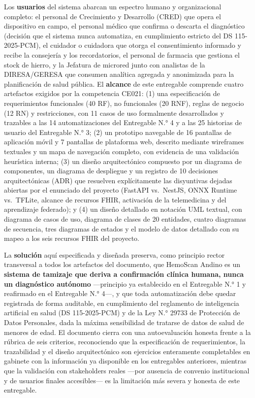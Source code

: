 \documentclass[11pt,a4paper]{article}
\begin{document}
Los \textbf{usuarios} del sistema abarcan un espectro humano y organizacional completo: el personal de Crecimiento y Desarrollo (CRED) que opera el dispositivo en campo, el personal médico que confirma o descarta el diagnóstico (decisión que el sistema nunca automatiza, en cumplimiento estricto del DS 115-2025-PCM), el cuidador o cuidadora que otorga el consentimiento informado y recibe la consejería y los recordatorios, el personal de farmacia que gestiona el stock de hierro, y la Jefatura de microred junto con analistas de la DIRESA/GERESA que consumen analítica agregada y anonimizada para la planificación de salud pública. El \textbf{alcance} de este entregable comprende cuatro artefactos exigidos por la competencia CE021: (1) una especificación de requerimientos funcionales (40 RF), no funcionales (20 RNF), reglas de negocio (12 RN) y restricciones, con 11 casos de uso formalmente desarrollados y trazables a las 14 automatizaciones del Entregable N.° 4 y a las 25 historias de usuario del Entregable N.° 3; (2) un prototipo navegable de 16 pantallas de aplicación móvil y 7 pantallas de plataforma web, descrito mediante wireframes textuales y un mapa de navegación completo, con evidencia de una validación heurística interna; (3) un diseño arquitectónico compuesto por un diagrama de componentes, un diagrama de despliegue y un registro de 10 decisiones arquitectónicas (ADR) que resuelven explícitamente las disyuntivas dejadas abiertas por el enunciado del proyecto (FastAPI vs.~NestJS, ONNX Runtime vs.~TFLite, alcance de recursos FHIR, activación de la telemedicina y del aprendizaje federado); y (4) un diseño detallado en notación UML textual, con diagrama de casos de uso, diagrama de clases de 20 entidades, cuatro diagramas de secuencia, tres diagramas de estados y el modelo de datos detallado con su mapeo a los seis recursos FHIR del proyecto.

La \textbf{solución} aquí especificada y diseñada preserva, como principio rector transversal a todos los artefactos del documento, que HemoScan Andino es un \textbf{sistema de tamizaje que deriva a confirmación clínica humana, nunca un diagnóstico autónomo} ---principio ya establecido en el Entregable N.° 1 y reafirmado en el Entregable N.° 4---, y que toda automatización debe quedar registrada de forma auditable, en cumplimiento del reglamento de inteligencia artificial en salud (DS 115-2025-PCM) y de la Ley N.° 29733 de Protección de Datos Personales, dada la máxima sensibilidad de tratarse de datos de salud de menores de edad. El documento cierra con una autoevaluación honesta frente a la rúbrica de seis criterios, reconociendo que la especificación de requerimientos, la trazabilidad y el diseño arquitectónico son ejercicios enteramente completables en gabinete con la información ya disponible en los entregables anteriores, mientras que la validación con stakeholders reales ---por ausencia de convenio institucional y de usuarios finales accesibles--- es la limitación más severa y honesta de este entregable.
\end{document}
